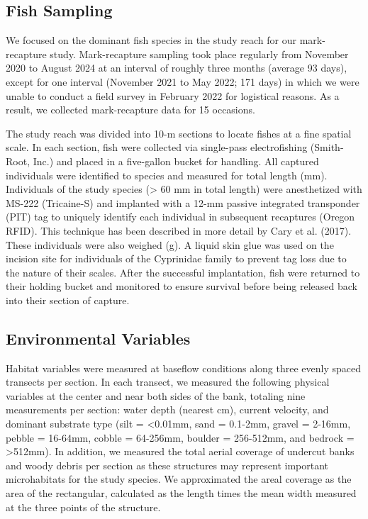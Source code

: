 \documentclass[11pt, class=article, crop=false]{standalone}
\begin{document}
\subsection{Fish Sampling}

We focused on the dominant fish species in the study reach for our mark-recapture study. Mark-recapture sampling took place regularly from November 2020 to August 2024 at an interval of roughly three months (average 93 days), except for one interval (November 2021 to May 2022; 171 days) in which we were unable to conduct a field survey in February 2022 for logistical reasons. As a result, we collected mark-recapture data for 15 occasions.

The study reach was divided into 10-m sections to locate fishes at a fine spatial scale. In each section, fish were collected via single-pass electrofishing (Smith-Root, Inc.) and placed in a five-gallon bucket for handling. All captured individuals were identified to species and measured for total length (mm). Individuals of the study species (> 60 mm in total length) were anesthetized with MS-222 (Tricaine-S) and implanted with a 12-mm passive integrated transponder (PIT) tag to uniquely identify each individual in subsequent recaptures (Oregon RFID). This technique has been described in more detail by Cary et al. (2017). These individuals were also weighed (g). A liquid skin glue was used on the incision site for individuals of the Cyprinidae family to prevent tag loss due to the nature of their scales. After the successful implantation, fish were returned to their holding bucket and monitored to ensure survival before being released back into their section of capture. 

\subsection{Environmental Variables}

Habitat variables were measured at baseflow conditions along three evenly spaced transects per section. In each transect, we measured the following physical variables at the center and near both sides of the bank, totaling nine measurements per section: water depth (nearest cm), current velocity, and dominant substrate type (silt = <0.01mm, sand = 0.1-2mm, gravel = 2-16mm, pebble = 16-64mm, cobble = 64-256mm, boulder = 256-512mm, and bedrock = >512mm). In addition, we measured the total aerial coverage of undercut banks and woody debris per section as these structures may represent important microhabitats for the study species. We approximated the areal coverage as the area of the rectangular, calculated as the length times the mean width measured at the three points of the structure.
\end{document}
